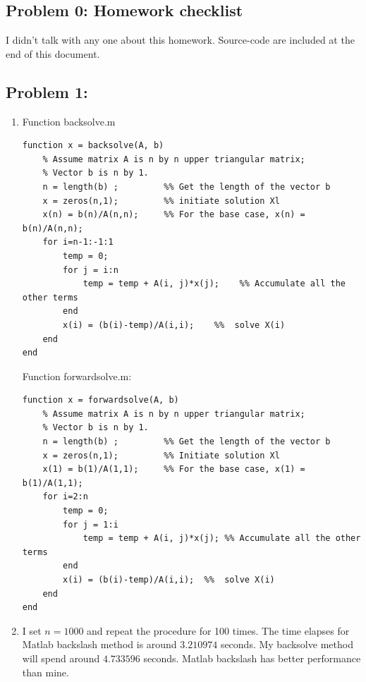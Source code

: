 \documentclass{article}
\begin{document}
 



\hypertarget{problem_0_homework_checklist_2}{}
\subsection*{{Problem 0: Homework checklist}}
\label{problem_0_homework_checklist_2}

\checkmark	I didn't talk with any one about this homework. \newline
\checkmark 	Source-code are included at the end of this document. 

\hypertarget{}{}
\subsection*{{Problem 1:}}
\label{}
\begin{enumerate}

\item 
Function backsolve.m
\begin{lstlisting} 
function x = backsolve(A, b) 
    % Assume matrix A is n by n upper triangular matrix; 
    % Vector b is n by 1. 
    n = length(b) ;         %% Get the length of the vector b
    x = zeros(n,1);         %% initiate solution Xl 
    x(n) = b(n)/A(n,n);     %% For the base case, x(n) = b(n)/A(n,n); 
    for i=n-1:-1:1
        temp = 0;           
        for j = i:n 
            temp = temp + A(i, j)*x(j);    %% Accumulate all the other terms
        end 
        x(i) = (b(i)-temp)/A(i,i);    %%  solve X(i)
    end 
end
\end{lstlisting} 

Function forwardsolve.m: 
\begin{lstlisting} 
function x = forwardsolve(A, b) 
    % Assume matrix A is n by n upper triangular matrix; 
    % Vector b is n by 1. 
    n = length(b) ;         %% Get the length of the vector b
    x = zeros(n,1);         %% Initiate solution Xl 
    x(1) = b(1)/A(1,1);     %% For the base case, x(1) = b(1)/A(1,1); 
    for i=2:n
        temp = 0; 
        for j = 1:i 
            temp = temp + A(i, j)*x(j); %% Accumulate all the other terms
        end 
        x(i) = (b(i)-temp)/A(i,i);  %%  solve X(i)
    end 
end

\end{lstlisting} 

\item 
 
 I set $n=1000$ and repeat the procedure for 100 times. The time elapses for  Matlab backslash method is around $3.210974$ seconds.  My backsolve method will spend around $4.733596 $ seconds.  Matlab backslash has better performance than mine. 
 

\end{enumerate}
\end{document}
